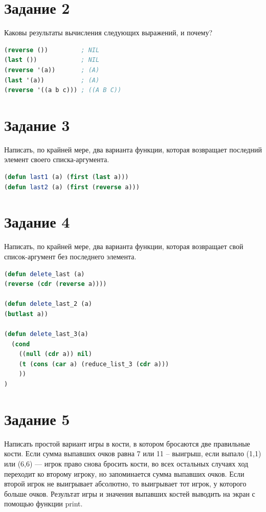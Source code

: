 \documentclass[12pt]{report}
\begin{document}
	

\section*{Задание 2}
Каковы результаты вычисления следующих выражений, и почему?

\begin{lstlisting}[label=9, language=lisp]
(reverse ())         ; NIL
(last ())            ; NIL
(reverse '(a))       ; (A)
(last '(a))          ; (A)
(reverse '((a b c))) ; ((A B C))
\end{lstlisting}

\section*{Задание 3}
Написать, по крайней мере, два варианта функции, которая возвращает последний элемент
своего списка-аргумента.

\begin{lstlisting}[label=9, language=lisp]
(defun last1 (a) (first (last a)))
(defun last2 (a) (first (reverse a)))
\end{lstlisting}


\clearpage

\section*{Задание 4}
Написать, по крайней мере, два варианта функции, которая возвращает свой список-аргумент без последнего элемента.

\begin{lstlisting}[label=9, language=lisp]
(defun delete_last (a) 
(reverse (cdr (reverse a))))

(defun delete_last_2 (a)
(butlast a))

(defun delete_last_3(a)                      
  (cond 
    ((null (cdr a)) nil)                        
    (t (cons (car a) (reduce_list_3 (cdr a)))
    ))
)
\end{lstlisting}



\section*{Задание 5}
Написать простой вариант игры в кости, в котором бросаются две правильные кости. Если
сумма выпавших очков равна 7 или 11 -- выигрыш, если выпало (1,1) или (6,6) --- игрок право
снова бросить кости, во всех остальных случаях ход переходит ко второму игроку, но
запоминается сумма выпавших очков. Если второй игрок не выигрывает абсолютно, то
выигрывает тот игрок, у которого больше очков. Результат игры и значения выпавших костей
выводить на экран с помощью функции print.
\end{document}
